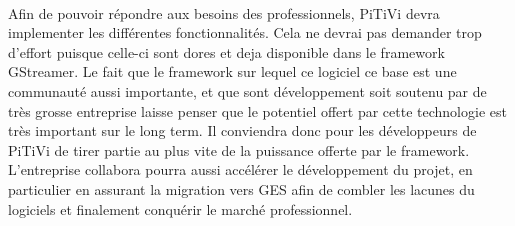\paragraph{}

Afin de pouvoir répondre aux besoins des professionnels, PiTiVi devra
implementer les différentes fonctionnalités. Cela ne devrai pas demander
trop d'effort puisque celle-ci sont dores et deja disponible dans le
framework GStreamer. Le fait que le framework sur lequel ce logiciel ce
base est une communauté aussi importante, et que sont développement soit
soutenu par de très grosse entreprise laisse penser que le potentiel
offert par cette technologie est très important sur le long term. Il
conviendra donc pour les développeurs de PiTiVi de tirer partie au plus
vite de la puissance offerte par le framework.  L'entreprise collabora
pourra aussi accélérer le développement du projet, en particulier en
assurant la migration vers GES afin de combler les lacunes du logiciels
et finalement conquérir le marché professionnel.
